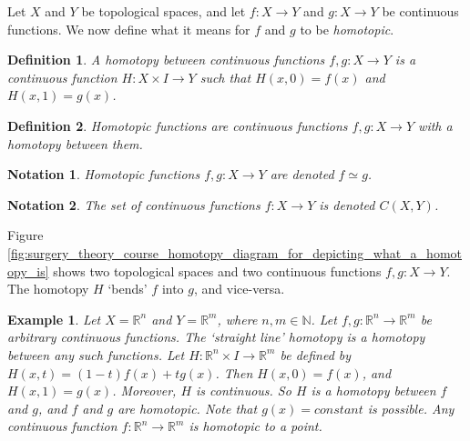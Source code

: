 \documentclass[oneside]{book}
\theoremstyle{mystyle}
\newtheorem{definition}{Definition}[section]
\newtheorem{example}{Example}[section]
\newtheorem{notation}{Notation}[section]
\begin{document}
Let $X$ and $Y$ be topological spaces, and let $f:X\rightarrow Y$ and $g:X\rightarrow Y$ be continuous functions. We now define what it means for $f$ and $g$ to be \textit{homotopic}.
\begin{definition}
A homotopy between continuous functions $f,g:X\rightarrow Y$ is a continuous function $H:X\times I \rightarrow Y$ such that $H(x,0)=f(x)$ and $H(x,1) = g(x)$.
\end{definition}
\begin{definition}
Homotopic functions are continuous functions $f,g:X\rightarrow Y$ with a homotopy between them.
\end{definition}
\begin{notation}
Homotopic functions $f,g:X\rightarrow Y$ are denoted $f\simeq g$.
\end{notation}
\begin{notation}
The set of continuous functions $f:X\rightarrow Y$ is denoted $C(X,Y)$.
\end{notation}
Figure \ref{fig:surgery_theory_course_homotopy_diagram_for_depicting_what_a_homotopy_is} shows two topological spaces and two continuous functions $f,g:X\rightarrow Y$. The homotopy $H$ `bends' $f$ into $g$, and vice-versa.
\begin{example}
Let $X = \mathbb{R}^{n}$ and $Y = \mathbb{R}^{m}$, where $n,m\in \mathbb{N}$. Let $f,g:\mathbb{R}^{n}\rightarrow \mathbb{R}^{m}$ be arbitrary continuous functions. The `straight line' homotopy is a homotopy between any such functions. Let $H:\mathbb{R}^{n}\times I \rightarrow \mathbb{R}^{m}$ be defined by $H(x,t) = (1-t)f(x)+tg(x)$. Then $H(x,0) = f(x)$, and $H(x,1) = g(x)$. Moreover, $H$ is continuous. So $H$ is a homotopy between $f$ and $g$, and $f$ and $g$ are homotopic. Note that $g(x) = constant$ is possible. Any continuous function $f:\mathbb{R}^{n}\rightarrow\mathbb{R}^{m}$ is homotopic to a point.
\end{example}
\end{document}
